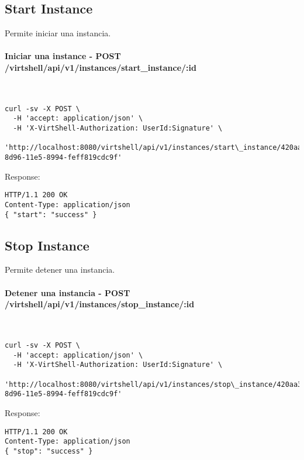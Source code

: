 \subsection{Start Instance}

Permite iniciar una instancia.

\paragraph{Iniciar una instance - POST /virtshell/api/v1/instances/start\_instance/:id} ~\\


\begin{lstlisting}[style=json]
curl -sv -X POST \
  -H 'accept: application/json' \
  -H 'X-VirtShell-Authorization: UserId:Signature' \
   'http://localhost:8080/virtshell/api/v1/instances/start\_instance/420aa3f0-8d96-11e5-8994-feff819cdc9f'
\end{lstlisting}

Response:

\begin{lstlisting}[style=json]
HTTP/1.1 200 OK
Content-Type: application/json
{ "start": "success" }
\end{lstlisting}


\subsection{Stop Instance}

Permite detener una instancia.

\paragraph{Detener una instancia - POST /virtshell/api/v1/instances/stop\_instance/:id} ~\\

\begin{lstlisting}[style=json]
curl -sv -X POST \
  -H 'accept: application/json' \
  -H 'X-VirtShell-Authorization: UserId:Signature' \
   'http://localhost:8080/virtshell/api/v1/instances/stop\_instance/420aa3f0-8d96-11e5-8994-feff819cdc9f'
\end{lstlisting}

Response:

\begin{lstlisting}[style=json]
HTTP/1.1 200 OK
Content-Type: application/json
{ "stop": "success" }
\end{lstlisting}



